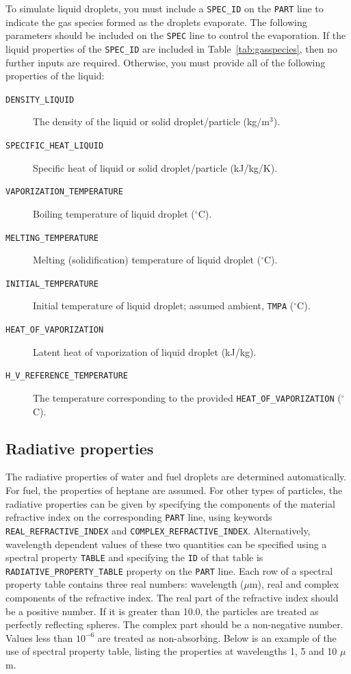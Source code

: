 \documentclass[11pt]{book}
\newcommand{\ct}{\tt\small}
\begin{document}
\label{thermal_part_props}

To simulate liquid droplets, you must include a {\ct SPEC\_ID} on the {\ct PART} line to indicate the gas species formed as the droplets evaporate. The following parameters should be
included on the {\ct SPEC} line to control the evaporation. If the liquid properties of the {\ct SPEC\_ID} are included in Table~\ref{tab:gasspecies},
then no further inputs are required. Otherwise, you must provide all of the following properties of the liquid:
\begin{description}
\item[{\ct DENSITY\_LIQUID}] The density of the liquid or solid droplet/particle (kg/m$^3$).
\item[{\ct SPECIFIC\_HEAT\_LIQUID}] Specific heat of liquid or solid droplet/particle (kJ/kg/K).
\item[{\ct VAPORIZATION\_TEMPERATURE}] Boiling temperature of liquid droplet ($^\circ$C).
\item[{\ct MELTING\_TEMPERATURE}] Melting (solidification) temperature of liquid droplet ($^\circ$C).
\item[{\ct INITIAL\_TEMPERATURE}] Initial temperature of liquid droplet; assumed ambient, {\ct TMPA} ($^\circ$C).
\item[{\ct HEAT\_OF\_VAPORIZATION}] Latent heat of vaporization of liquid droplet (kJ/kg).
\item[{\ct H\_V\_REFERENCE\_TEMPERATURE}] The temperature corresponding to the provided {\ct HEAT\_OF\_VAPORIZATION} ($^\circ$C).
\end{description}

\subsection{Radiative properties}

\label{radiative_part_props}

The radiative properties of water and fuel droplets are determined automatically.
For fuel, the properties of heptane are assumed. For other types of particles, the
radiative properties can be given by specifying the components of the material refractive index on the corresponding {\ct PART} line, using keywords
{\ct REAL\_REFRACTIVE\_INDEX} and {\ct COMPLEX\_REFRACTIVE\_INDEX}. Alternatively, wavelength dependent values of these two quantities can be specified using
a spectral property {\ct TABLE} and specifying the {\ct ID} of that table is {\ct RADIATIVE\_PROPERTY\_TABLE} property on the {\ct PART} line.
Each row of a spectral property table contains three real numbers: wavelength ($\mu$m), real and complex components of the refractive index.
The real part of the refractive index should be a positive number. If it is greater than 10.0, the particles are treated as perfectly reflecting spheres.
The complex part should be a non-negative number. Values less than $10^{-6}$ are treated as non-absorbing.
Below is an example of the use of spectral property table, listing the properties at wavelengths 1, 5 and 10 $\mu$m.
\end{document}
